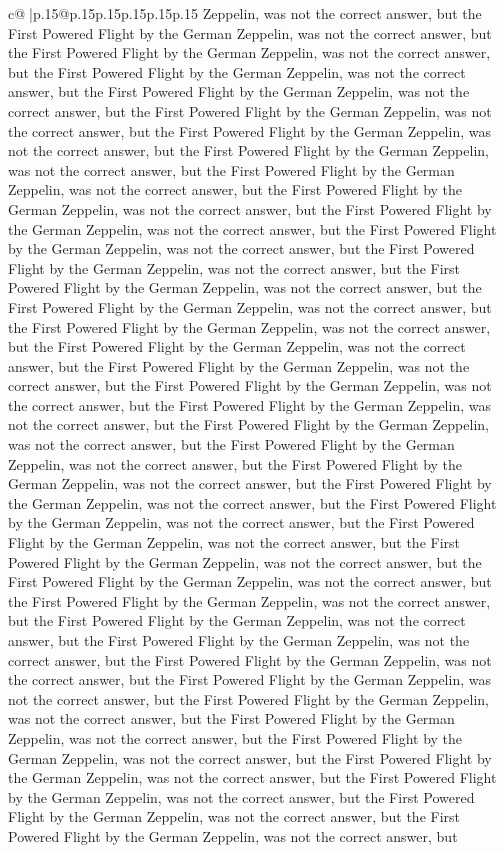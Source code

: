 \documentclass{article}
\begin{document}
{\begin{supertabular}{c@{$\;$}|p{.15\linewidth}@{}p{.15\linewidth}p{.15\linewidth}p{.15\linewidth}p{.15\linewidth}p{.15\linewidth}}
{{{Zeppelin, was not the correct answer, but the First Powered Flight by the German Zeppelin, was not the correct answer, but the First Powered Flight by the German Zeppelin, was not the correct answer, but the First Powered Flight by the German Zeppelin, was not the correct answer, but the First Powered Flight by the German Zeppelin, was not the correct answer, but the First Powered Flight by the German Zeppelin, was not the correct answer, but the First Powered Flight by the German Zeppelin, was not the correct answer, but the First Powered Flight by the German Zeppelin, was not the correct answer, but the First Powered Flight by the German Zeppelin, was not the correct answer, but the First Powered Flight by the German Zeppelin, was not the correct answer, but the First Powered Flight by the German Zeppelin, was not the correct answer, but the First Powered Flight by the German Zeppelin, was not the correct answer, but the First Powered Flight by the German Zeppelin, was not the correct answer, but the First Powered Flight by the German Zeppelin, was not the correct answer, but the First Powered Flight by the German Zeppelin, was not the correct answer, but the First Powered Flight by the German Zeppelin, was not the correct answer, but the First Powered Flight by the German Zeppelin, was not the correct answer, but the First Powered Flight by the German Zeppelin, was not the correct answer, but the First Powered Flight by the German Zeppelin, was not the correct answer, but the First Powered Flight by the German Zeppelin, was not the correct answer, but the First Powered Flight by the German Zeppelin, was not the correct answer, but the First Powered Flight by the German Zeppelin, was not the correct answer, but the First Powered Flight by the German Zeppelin, was not the correct answer, but the First Powered Flight by the German Zeppelin, was not the correct answer, but the First Powered Flight by the German Zeppelin, was not the correct answer, but the First Powered Flight by the German Zeppelin, was not the correct answer, but the First Powered Flight by the German Zeppelin, was not the correct answer, but the First Powered Flight by the German Zeppelin, was not the correct answer, but the First Powered Flight by the German Zeppelin, was not the correct answer, but the First Powered Flight by the German Zeppelin, was not the correct answer, but the First Powered Flight by the German Zeppelin, was not the correct answer, but the First Powered Flight by the German Zeppelin, was not the correct answer, but the First Powered Flight by the German Zeppelin, was not the correct answer, but the First Powered Flight by the German Zeppelin, was not the correct answer, but the First Powered Flight by the German Zeppelin, was not the correct answer, but the First Powered Flight by the German Zeppelin, was not the correct answer, but the First Powered Flight by the German Zeppelin, was not the correct answer, but the First Powered Flight by the German Zeppelin, was not the correct answer, but the First Powered Flight by the German Zeppelin, was not the correct answer, but the First Powered Flight by the German Zeppelin, was not the correct answer, but }}}
\end{supertabular}}
\end{document}
